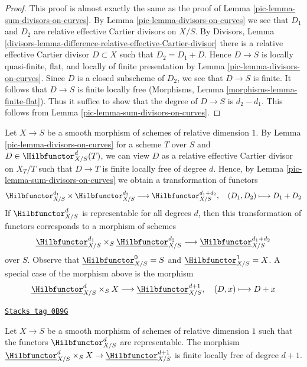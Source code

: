 \begin{proof}

This proof is almost exactly the same as the proof of
Lemma \ref{pic-lemma-sum-divisors-on-curves}.
By Lemma \ref{pic-lemma-divisors-on-curves} we see that $D_1$
and $D_2$ are relative effective Cartier divisors on $X/S$.
By Divisors, Lemma
\ref{divisors-lemma-difference-relative-effective-Cartier-divisor}
there is a relative effective Cartier divisor $D \subset X$
such that $D_2 = D_1 + D$. Hence $D \to S$ is locally quasi-finite, flat, and
locally of finite presentation by
Lemma \ref{pic-lemma-divisors-on-curves}.
Since $D$ is a closed subscheme of $D_2$, we see that
$D \to S$ is finite. It follows that $D \to S$ is finite locally free
(Morphisms, Lemma \ref{morphisms-lemma-finite-flat}).
Thus it suffice to show that the degree of $D \to S$ is $d_2 - d_1$.
This follows from Lemma \ref{pic-lemma-sum-divisors-on-curves}.
\end{proof}

Let $X \to S$ be a smooth morphism of schemes of relative dimension $1$.
By Lemma \ref{pic-lemma-divisors-on-curves} for a scheme $T$ over $S$ and
$D \in \Hilbfunctor^d_{X/S}(T)$, we can view $D$ as a relative
effective Cartier divisor on $X_T/T$ such that $D \to T$ is finite
locally free of degree $d$. Hence, by
Lemma \ref{pic-lemma-sum-divisors-on-curves} we obtain a transformation
of functors
$$
\Hilbfunctor^{d_1}_{X/S} \times \Hilbfunctor^{d_2}_{X/S}
\longrightarrow
\Hilbfunctor^{d_1 + d_2}_{X/S},\quad
(D_1, D_2) \longmapsto D_1 + D_2
$$
If $\Hilbfunctor^d_{X/S}$ is representable for all degrees $d$, then
this transformation of functors corresponds to a morphism of schemes
$$
\underline{\Hilbfunctor}^{d_1}_{X/S}
\times_S
\underline{\Hilbfunctor}^{d_2}_{X/S}
\longrightarrow
\underline{\Hilbfunctor}^{d_1 + d_2}_{X/S}
$$
over $S$. Observe that $\underline{\Hilbfunctor}^0_{X/S} = S$ and
$\underline{\Hilbfunctor}^1_{X/S} = X$.
A special case of the morphism above is the morphism
$$
\underline{\Hilbfunctor}^d_{X/S} \times_S X
\longrightarrow
\underline{\Hilbfunctor}^{d + 1}_{X/S},\quad
(D, x) \longmapsto D + x
$$

\begin{lemma}
\label{pic-lemma-universal-object}
\href{https://stacks.math.columbia.edu/tag/0B9G}{\texttt{Stacks tag 0B9G}}

Let $X \to S$ be a smooth morphism of schemes of relative dimension $1$
such that the functors $\Hilbfunctor^d_{X/S}$ are representable. The morphism
$\underline{\Hilbfunctor}^d_{X/S} \times_S X \to
\underline{\Hilbfunctor}^{d + 1}_{X/S}$
is finite locally free of degree $d + 1$.
\end{lemma}

